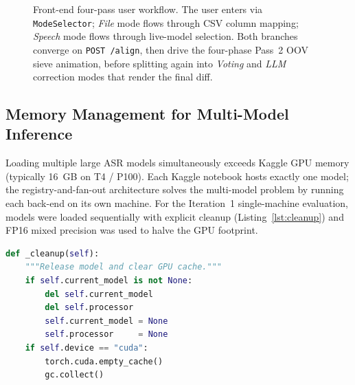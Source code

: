 \begin{figure}[htbp]
{}
    \caption[Front-end four-pass workflow state diagram]{Front-end four-pass user workflow. The user enters via \texttt{ModeSelector}; \emph{File} mode flows through CSV column mapping; \emph{Speech} mode flows through live-model selection. Both branches converge on \texttt{POST /align}, then drive the four-phase Pass~2 OOV sieve animation, before splitting again into \emph{Voting} and \emph{LLM} correction modes that render the final diff.}
    \label{fig:frontend-workflow}
\end{figure}

\subsection{Memory Management for Multi-Model Inference}
\label{ssec:memory}

Loading multiple large ASR models simultaneously exceeds Kaggle GPU memory (typically 16~GB on T4 / P100). Each Kaggle notebook hosts exactly one model; the registry-and-fan-out architecture solves the multi-model problem by running each back-end on its own machine. For the Iteration~1 single-machine evaluation, models were loaded sequentially with explicit cleanup (Listing~\ref{lst:cleanup}) and FP16 mixed precision was used to halve the GPU footprint.

\begin{lstlisting}[language=Python,caption={Sequential model loading with explicit cleanup (Iteration~1).},label={lst:cleanup}]
def _cleanup(self):
    """Release model and clear GPU cache."""
    if self.current_model is not None:
        del self.current_model
        del self.processor
        self.current_model = None
        self.processor     = None
    if self.device == "cuda":
        torch.cuda.empty_cache()
        gc.collect()
\end{lstlisting}

